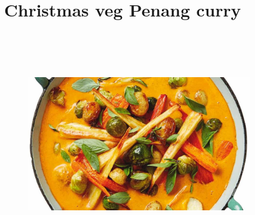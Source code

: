 \documentclass{book}
\begin{document}
\section{Christmas veg Penang curry}
\begin{figure}
\centering\includegraphics[width=10cm,height=10cm,keepaspectratio]{Recipe_Pictures/Christmas_veg_Penang_curry.png}
\end{figure}
\end{document}
